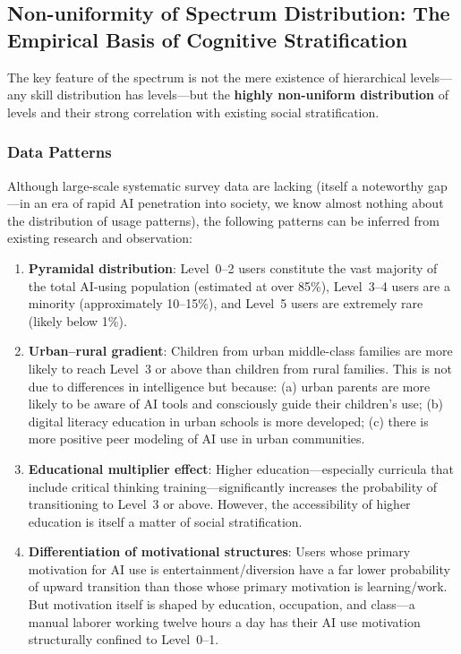 ﻿\documentclass[12pt,a4paper]{article}
\begin{document}
\subsection{Non-uniformity of Spectrum Distribution: The Empirical Basis of Cognitive Stratification}

The key feature of the spectrum is not the mere existence of hierarchical levels---any skill distribution has levels---but the \textbf{highly non-uniform distribution} of levels and their strong correlation with existing social stratification.

\subsubsection{Data Patterns}

Although large-scale systematic survey data are lacking (itself a noteworthy gap---in an era of rapid AI penetration into society, we know almost nothing about the distribution of usage patterns), the following patterns can be inferred from existing research and observation:

\begin{enumerate}[label=(\arabic*)]
\item \textbf{Pyramidal distribution}: Level~0--2 users constitute the vast majority of the total AI-using population (estimated at over 85\%), Level~3--4 users are a minority (approximately 10--15\%), and Level~5 users are extremely rare (likely below 1\%).
\item \textbf{Urban--rural gradient}: Children from urban middle-class families are more likely to reach Level~3 or above than children from rural families. This is not due to differences in intelligence but because: (a) urban parents are more likely to be aware of AI tools and consciously guide their children's use; (b) digital literacy education in urban schools is more developed; (c) there is more positive peer modeling of AI use in urban communities.
\item \textbf{Educational multiplier effect}: Higher education---especially curricula that include critical thinking training---significantly increases the probability of transitioning to Level~3 or above. However, the accessibility of higher education is itself a matter of social stratification.
\item \textbf{Differentiation of motivational structures}: Users whose primary motivation for AI use is entertainment/diversion have a far lower probability of upward transition than those whose primary motivation is learning/work. But motivation itself is shaped by education, occupation, and class---a manual laborer working twelve hours a day has their AI use motivation structurally confined to Level~0--1.
\end{enumerate}
\end{document}
